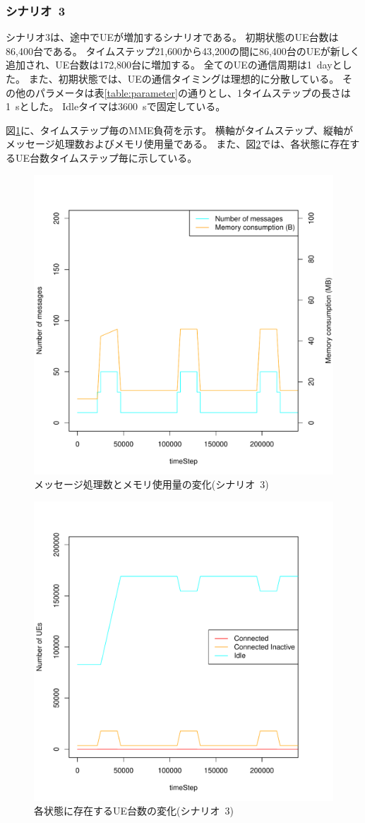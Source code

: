 \documentclass[a4j]{ujarticle}
\begin{document}
\subsubsection{シナリオ~3}
シナリオ3は、途中でUEが増加するシナリオである。
初期状態のUE台数は86,400台である。
タイムステップ21,600から43,200の間に86,400台のUEが新しく追加され、UE台数は172,800台に増加する。
全てのUEの通信周期は1~dayとした。%
また、初期状態では、UEの通信タイミングは理想的に分散している。
その他のパラメータは表\ref{table:parameter}の通りとし、1タイムステップの長さは1~sとした。
Idleタイマは3600~sで固定している。

図\ref{scenario_3_signaling_and_memoryload_vs_timeStep}に、タイムステップ毎のMME負荷を示す。
横軸がタイムステップ、縦軸がメッセージ処理数およびメモリ使用量である。
また、図\ref{scenario_3_stateBreakdown}では、各状態に存在するUE台数タイムステップ毎に示している。

\begin{figure}[htbp]
  \begin{center}
    \includegraphics[width=0.6\hsize]{scenario_4_signaling_and_memoryload_vs_timeStep_all.pdf}
    \caption{メッセージ処理数とメモリ使用量の変化(シナリオ~3)}
    \label{scenario_3_signaling_and_memoryload_vs_timeStep}
  \end{center}
\end{figure}
\begin{figure}[htbp]
  \begin{center}
    \includegraphics[width=0.6\hsize]{scenario_4_stateBreakdown_all.pdf}
    \caption{各状態に存在するUE台数の変化(シナリオ~3)}
    \label{scenario_3_stateBreakdown}
  \end{center}
\end{figure}
\end{document}
